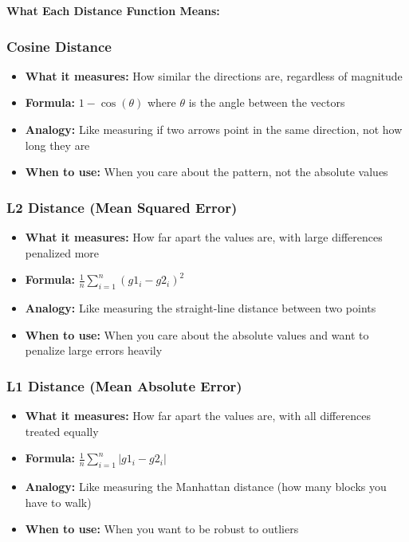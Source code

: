 \documentclass[12pt]{article}
\begin{document}
\textbf{What Each Distance Function Means:}

\subsubsection{Cosine Distance}
\begin{itemize}
    \item \textbf{What it measures:} How similar the directions are, regardless of magnitude
    \item \textbf{Formula:} $1 - \cos(\theta)$ where $\theta$ is the angle between the vectors
    \item \textbf{Analogy:} Like measuring if two arrows point in the same direction, not how long they are
    \item \textbf{When to use:} When you care about the pattern, not the absolute values
\end{itemize}

\subsubsection{L2 Distance (Mean Squared Error)}
\begin{itemize}
    \item \textbf{What it measures:} How far apart the values are, with large differences penalized more
    \item \textbf{Formula:} $\frac{1}{n}\sum_{i=1}^{n}(g1_i - g2_i)^2$
    \item \textbf{Analogy:} Like measuring the straight-line distance between two points
    \item \textbf{When to use:} When you care about the absolute values and want to penalize large errors heavily
\end{itemize}

\subsubsection{L1 Distance (Mean Absolute Error)}
\begin{itemize}
    \item \textbf{What it measures:} How far apart the values are, with all differences treated equally
    \item \textbf{Formula:} $\frac{1}{n}\sum_{i=1}^{n}|g1_i - g2_i|$
    \item \textbf{Analogy:} Like measuring the Manhattan distance (how many blocks you have to walk)
    \item \textbf{When to use:} When you want to be robust to outliers
\end{itemize}
\end{document}
